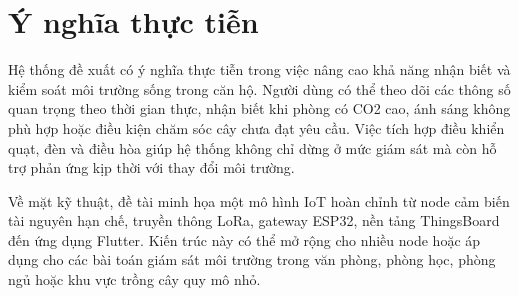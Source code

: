\section{Ý nghĩa thực tiễn}
Hệ thống đề xuất có ý nghĩa thực tiễn trong việc nâng cao khả năng nhận biết và kiểm soát môi trường sống trong căn hộ. Người dùng có thể theo dõi các thông số quan trọng theo thời gian thực, nhận biết khi phòng có CO2 cao, ánh sáng không phù hợp hoặc điều kiện chăm sóc cây chưa đạt yêu cầu. Việc tích hợp điều khiển quạt, đèn và điều hòa giúp hệ thống không chỉ dừng ở mức giám sát mà còn hỗ trợ phản ứng kịp thời với thay đổi môi trường.

Về mặt kỹ thuật, đề tài minh họa một mô hình IoT hoàn chỉnh từ node cảm biến tài nguyên hạn chế, truyền thông LoRa, gateway ESP32, nền tảng ThingsBoard đến ứng dụng Flutter. Kiến trúc này có thể mở rộng cho nhiều node hoặc áp dụng cho các bài toán giám sát môi trường trong văn phòng, phòng học, phòng ngủ hoặc khu vực trồng cây quy mô nhỏ.
